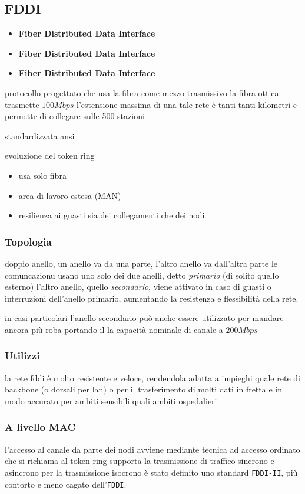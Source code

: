 \documentclass[11pt]{article}
\begin{document}
\subsection{FDDI}
\label{sec:org771105f}
\begin{itemize}
\item \textbf{Fiber Distributed Data Interface}
\item \textbf{Fiber Distributed Data Interface}
\item \textbf{Fiber Distributed Data Interface}
\end{itemize}
protocollo progettato che usa la fibra come mezzo trasmissivo
la fibra ottica trasmette \(100 Mbps\) l'estensione massima di una tale rete è tanti tanti kilometri e permette di collegare sulle 500 stazioni

standardizzata ansi

evoluzione del token ring

\begin{itemize}
\item usa solo fibra
\item area di lavoro estesa (MAN)
\item resilienza ai guasti sia dei collegamenti che dei nodi
\end{itemize}

\subsubsection{Topologia}
\label{sec:org7243735}
doppio anello, un anello va da una parte, l'altro anello va dall'altra parte
le comuncazionu usano uno solo dei due anelli, detto \emph{primario} (di solito quello esterno)
l'altro anello, quello \emph{secondario}, viene attivato in caso di guasti o interruzioni dell'anello primario, aumentando la resistenza e flessibilità della rete.

in casi particolari l'anello secondario può anche essere utilizzato per mandare ancora più roba portando il la capacità nominale di canale a \(200 Mbps\)

\subsubsection{Utilizzi}
\label{sec:org03cc5b9}
la rete fddi è molto resistente e veloce, rendendola adatta a impieghi quale rete di backbone (o dorsali per lan) o per il trasferimento di molti dati in fretta e in modo accurato per ambiti sensibili quali ambiti ospedalieri.

\subsubsection{A livello MAC}
\label{sec:org049584f}
l'accesso al canale da parte dei nodi avviene mediante tecnica ad accesso ordinato che si richiama al token ring
supporta la trasmissione di traffico sincrono e asincrono
per la trasmissione isocrono è stato definito uno standard \texttt{FDDI-II}, più contorto e meno cagato dell'\texttt{FDDI}.
\end{document}
